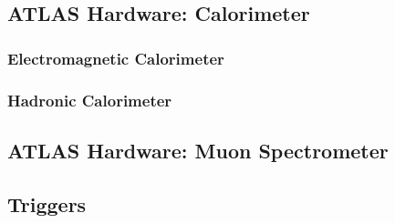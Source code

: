 \subsection{ATLAS Hardware: Calorimeter}

\subsubsection{Electromagnetic Calorimeter}
\label{EMCalo} 

\subsubsection{Hadronic Calorimeter}
\label{Had}

\subsection{ATLAS Hardware: Muon Spectrometer}

\subsection{Triggers}
\label{Trig}
